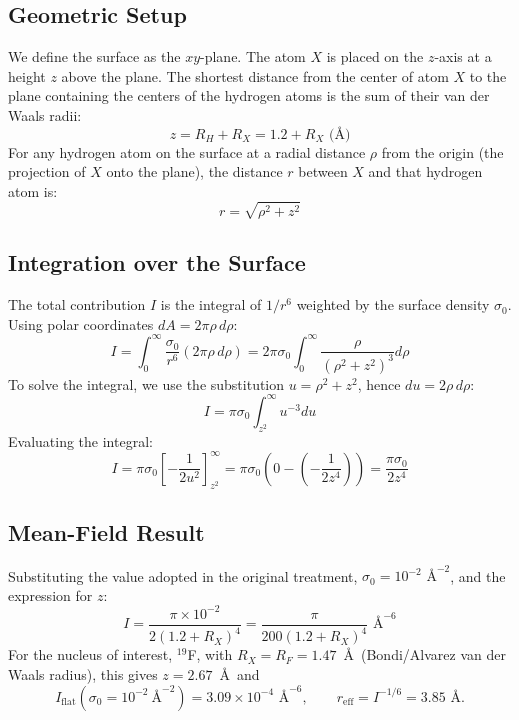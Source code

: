 \documentclass[11pt]{article}
\begin{document}
\subsection{Geometric Setup}
We define the surface as the $xy$-plane. The atom $X$ is placed on the $z$-axis at a height $z$ above the plane. The shortest distance from the center of atom $X$ to the plane containing the centers of the hydrogen atoms is the sum of their van der Waals radii:
\begin{equation}
z = R_H + R_X = 1.2 + R_X \text{ (\AA)}
\end{equation}
For any hydrogen atom on the surface at a radial distance $\rho$ from the origin (the projection of $X$ onto the plane), the distance $r$ between $X$ and that hydrogen atom is:
\begin{equation}
r = \sqrt{\rho^2 + z^2}
\end{equation}

\subsection{Integration over the Surface}
The total contribution $I$ is the integral of $1/r^6$ weighted by the surface density $\sigma_0$. Using polar coordinates $dA = 2\pi \rho \, d\rho$:
\begin{equation}
I = \int_{0}^{\infty} \frac{\sigma_0}{r^6} (2\pi \rho \, d\rho) = 2\pi \sigma_0 \int_{0}^{\infty} \frac{\rho}{(\rho^2 + z^2)^3} d\rho
\end{equation}
To solve the integral, we use the substitution $u = \rho^2 + z^2$, hence $du = 2\rho \, d\rho$:
\begin{equation}
I = \pi \sigma_0 \int_{z^2}^{\infty} u^{-3} du
\end{equation}
Evaluating the integral:
\begin{equation}
I = \pi \sigma_0 \left[ -\frac{1}{2u^2} \right]_{z^2}^{\infty} = \pi \sigma_0 \left( 0 - \left( -\frac{1}{2z^4} \right) \right) = \frac{\pi \sigma_0}{2z^4}
\end{equation}

\subsection{Mean-Field Result}
Substituting the value adopted in the original treatment, $\sigma_0 = 10^{-2} \text{ \AA}^{-2}$, and the expression for $z$:
\begin{equation}
I = \frac{\pi \times 10^{-2}}{2(1.2 + R_X)^4} = \frac{\pi}{200(1.2 + R_X)^4} \text{ \AA}^{-6}
\end{equation}
For the nucleus of interest, $^{19}$F, with $R_X = R_F = 1.47$~\AA\ (Bondi/Alvarez van der Waals radius), this gives $z = 2.67$~\AA\ and
\begin{equation}
I_{\mathrm{flat}}(\sigma_0 = 10^{-2}~\text{\AA}^{-2}) = 3.09 \times 10^{-4} \text{ \AA}^{-6}, \qquad r_{\mathrm{eff}} = I^{-1/6} = 3.85 \text{ \AA}.
\end{equation}
\end{document}
